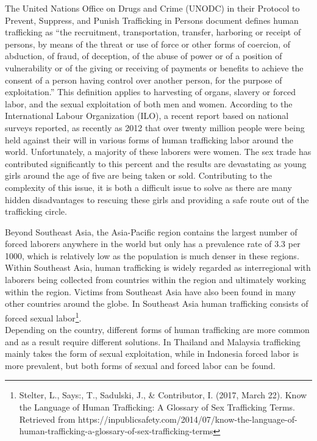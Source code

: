 \documentclass[10pt, letterpaper]{article}
\begin{document}
The United Nations Office on Drugs and Crime (UNODC) in their Protocol
to Prevent, Suppress, and Punish Trafficking in Persons document defines
human trafficking as ``the recruitment, transportation, transfer,
harboring or receipt of persons, by means of the threat or use of force
or other forms of coercion, of abduction, of fraud, of deception, of the
abuse of power or of a position of vulnerability or of the giving or
receiving of payments or benefits to achieve the consent of a person
having control over another person, for the purpose of exploitation.''
This definition applies to harvesting of organs, slavery or forced
labor, and the sexual exploitation of both men and women. According to
the International Labour Organization (ILO), a recent report based on
national surveys reported, as recently as 2012 that over twenty million
people were being held against their will in various forms of human
trafficking labor around the world. Unfortunately, a majority of these
laborers were women. The sex trade has contributed significantly to this
percent and the results are devastating as young girls around the age of
five are being taken or sold. Contributing to the complexity of this
issue, it is both a difficult issue to solve as there are many hidden
disadvantages to rescuing these girls and providing a safe route out of
the trafficking circle. 

Beyond Southeast Asia, the Asia-Pacific region contains the largest
number of forced laborers anywhere in the world but only has a
prevalence rate of 3.3 per 1000, which is relatively low as the
population is much denser in these regions. Within Southeast Asia, human
trafficking is widely regarded as interregional with laborers being
collected from countries within the region and ultimately working within
the region. Victims from Southeast Asia have also been found in many
other countries around the globe. In Southeast Asia human trafficking
consists of forced sexual labor\footnote{Stelter, L., Says:, T.,
  Sadulski, J., \& Contributor, I. (2017, March 22). Know the Language
  of Human Trafficking: A Glossary of Sex Trafficking Terms. Retrieved
  from
  https://inpublicsafety.com/2014/07/know-the-language-of-human-trafficking-a-glossary-of-sex-trafficking-terms}. \\

Depending on the country, different forms of human trafficking are more
common and as a result require different solutions. In Thailand and
Malaysia trafficking mainly takes the form of sexual exploitation, while
in Indonesia forced labor is more prevalent, but both forms of sexual
and forced labor can be found. \\
\end{document}
